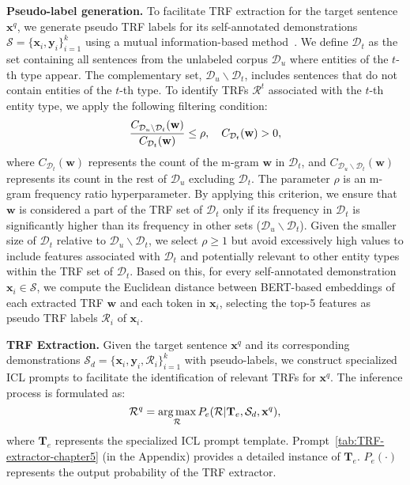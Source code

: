 \noindent \textbf{Pseudo-label generation.}
To facilitate \ac{TRF} extraction for the target sentence $\mathbf{x}^q$, we generate pseudo TRF labels for its self-annotated demonstrations $\mathcal{S}=\{\mathbf{x}_i, \mathbf{y}_i\}_{i=1}^k$ using a mutual infor\-mation-based method~\citep{DBLP:conf/emnlp/WangZCRRR23}. 
We define $\mathcal{D}_t$ as the set containing all sentences from the unlabeled corpus $\mathcal{D}_u$ where entities of the $t$-th type appear. The complementary set, $\mathcal{D}_u \backslash \mathcal{D}_t$, includes sentences that do not contain entities of the $t$-th type. To identify TRFs $\mathcal{R}^t$ associated with the $t$-th entity type, we apply the following filtering condition:
%
\begin{equation}
\setlength{\abovedisplayskip}{5pt}
\setlength{\belowdisplayskip}{5pt}
\frac{C_{\mathcal{D}_u \backslash \mathcal{D}_t}(\mathbf{w})}{C_{\mathcal{D}_t}(\mathbf{w})} \leq \rho, \quad  C_{\mathcal{D}_t}(\mathbf{w}) > 0,
\end{equation}
%
where $C_{\mathcal{D}_t}(\mathbf{w})$ represents the count of the m-gram $\mathbf{w}$ in $\mathcal{D}_t$, and $C_{\mathcal{D}_u \backslash \mathcal{D}_t}(\mathbf{w})$ represents its count in the rest of $\mathcal{D}_u$ excluding $\mathcal{D}_t$. The parameter $\rho$ is an m-gram frequency ratio hyperparameter. By applying this criterion, we ensure that $\mathbf{w}$ is considered a part of the TRF set of $\mathcal{D}_t$ only if its frequency in $\mathcal{D}_t$ is significantly higher than its frequency in other sets ($\mathcal{D}_u \backslash \mathcal{D}_t$). Given the smaller size of $\mathcal{D}_t$ relative to $\mathcal{D}_u \backslash \mathcal{D}_t$, we select $\rho \geq 1$ but avoid excessively high values to include features associated with $\mathcal{D}_t$ and potentially relevant to other entity types within the TRF set of $\mathcal{D}_t$. Based on this, for every self-annotated demonstration $\mathbf{x}_i \in \mathcal{S}$, we compute the Euclidean distance between BERT-based embeddings of each extracted \ac{TRF} $\mathbf{w}$ and each token in $\mathbf{x}_i$, selecting the top-5 features as pseudo \ac{TRF} labels $\mathcal{R}_i$ of  $\mathbf{x}_i$.

\noindent \textbf{TRF Extraction.}
Given the target sentence $\mathbf{x}^q$ and its corresponding demonstrations $\mathcal{S}_d = \{\mathbf{x}_i, \mathbf{y}_i, \mathcal{R}_i\}_{i=1}^k$ with pseudo-labels, we construct specialized \ac{ICL} prompts to facilitate the identification of relevant \acp{TRF} for $\mathbf{x}^q$.
The inference process is formulated as:
\begin{equation}
\setlength{\abovedisplayskip}{6pt}
\setlength{\belowdisplayskip}{6pt}
\mathcal{R}^q = \mathop{\arg\max}_{\mathcal{R}} P_{e}(\mathcal{R} | \mathbf{T}_{e}, \mathcal{S}_d, \mathbf{x}^q),
\end{equation}
where $\mathbf{T}_{e}$ represents the specialized \ac{ICL} prompt template. Prompt~\ref{tab:TRF-extractor-chapter5} (in the Appendix) provides a detailed instance of $\mathbf{T}_{e}$.
$P_{e}(\cdot)$ represents the output probability of the \ac{TRF} extractor.

